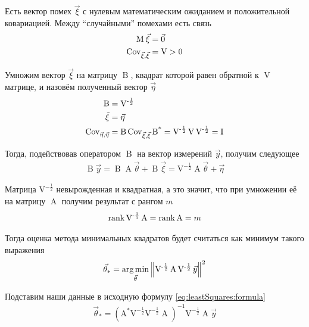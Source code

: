 Есть вектор помех $\vec{\xi}$ с нулевым математическим ожиданием и положительной
ковариацией. Между ``случайными'' помехами есть связь
\begin{align*}
  \operatorname{M}_{} \vec{\xi} &= \vec{0} \\
  \operatorname{Cov}^{}_{\vec{\xi}, \vec{\xi}} &= \operatorname{V} > 0
\end{align*}

Умножим вектор $\vec{\xi}$ на матрицу $\operatorname{B}$, квадрат которой равен
обратной к $\operatorname{V}$ матрице, и назовём полученный вектор $\vec{\eta}$
\begin{align*}
  \operatorname{B} &= \operatorname{V^{-\frac{1}{2}}} \\
  \operatorname{\vec{\xi}} &= \vec{\eta} \\
  \operatorname{Cov}^{}_{\vec{\eta}, \vec{\eta}} &= \operatorname{B} \operatorname{Cov}^{}_{\vec{\xi}, \vec{\xi}} \operatorname{B^*}
      = \operatorname{V^{-\frac{1}{2}}} \operatorname{V}
      \operatorname{V^{-\frac{1}{2}}} = \operatorname{I}
\end{align*}

Тогда, подействовав оператором $\operatorname{B}$ на вектор измерений $\vec{y}$,
получим следующее
\begin{align*}
  \operatorname{B} \vec{y}
  = \operatorname{B} \operatorname{A} \vec{\theta}
      + \operatorname{B} \vec{\xi}
  = \operatorname{V^{-\frac{1}{2}}} \operatorname{A} \vec{\theta} + \vec{\eta}
\end{align*}

Матрица $\operatorname{V^{-\frac{1}{2}}}$ невырожденная и квадратная, а это
значит, что при умножении её на матрицу $\operatorname{A}$ получим результат
с рангом $m$
\begin{align*}
  \operatorname{rank}{\operatorname{V^{-\frac{1}{1}}} \operatorname{A}}
  = \operatorname{rank}{\operatorname{A}}
  = m
\end{align*}

Тогда оценка метода минимальных квадратов будет считаться как минимум такого
выражения
\begin{align*}
  \vec{\theta}_*
  = \underset{\vec{\theta}}{\operatorname{arg\,min}}\left\| \operatorname{V^{-\frac{1}{2}}} \operatorname{A}
      \operatorname{V^{-\frac{1}{2}}} \vec{y} \right\|^2
\end{align*}

Подставим наши данные в исходную формулу \eqref{eq:leastSquares:formula}
\begin{align*}
  \vec{\theta}_*
  = \left( \operatorname{A^*} \operatorname{V^{-\frac{1}{2}}}
      \operatorname{V^{-\frac{1}{2}}} \operatorname{A} \right)^{-1}
      \operatorname{V^{-\frac{1}{2}}} \operatorname{A} \vec{y}
\end{align*}

